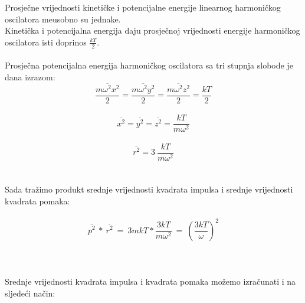 \documentclass[a4paper,12pt]{article}
\begin{document}
\newpage
Prosje\v{c}ne vrijednosti kineti\v{c}ke i potencijalne energije linearnog harmoni\v{c}kog oscilatora me\dj usobno su jednake.
\\
Kineti\v{c}ka i potencijalna energija daju prosje\v{c}noj vrijednosti energije harmoni\v{c}kog oscilatora isti doprinos $\frac{kT}{2}$.
\\
\\
Prosje\v{c}na potencijalna energija harmoni\v{c}kog oscilatora sa tri stupnja slobode je dana izrazom:
\\
$$ \overline{\frac{m\omega^2x^2}{2}} = \overline{\frac{m\omega^2y^2}{2}} = \overline{\frac{m\omega^2z^2}{2}} = \frac{kT}{2} $$
\\
$$ \overline{x^2} = \overline{y^2} = \overline{z^2} = \frac{kT}{m\omega^2} $$
\\
$$ \overline{r^2} = 3\ \frac{kT}{m\omega^2} $$
\\
\\
Sada tra\v{z}imo produkt srednje vrijednosti kvadrata impulsa i srednje vrijednosti kvadrata pomaka:
\\
\\
$$ \overline{p^2}\ *\ \overline{r^2}\ =\ 3mkT*\frac{3kT}{m\omega^2}\ =\ \left( \frac{3kT}{\omega} \right)^2 $$
\\
\\
\\
Srednje vrijednosti kvadrata impulsa i kvadrata pomaka mo\v{z}emo izra\v{c}unati i na sljede\'ci na\v{c}in:
\\







\newpage
\end{document}
